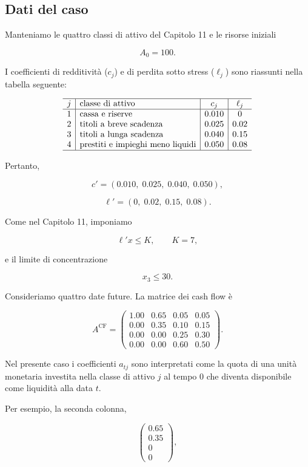 \subsection{Dati del caso}

Manteniamo le quattro classi di attivo del Capitolo 11 e le risorse iniziali

\[
A_0=100.
\]

I coefficienti di redditivit\`a ($c_j$) e di perdita sotto stress ($\ell_j$) sono riassunti
nella tabella seguente:

\[
\begin{array}{c|l|c|c}
\hline
j & \text{classe di attivo} & c_j & \ell_j\\
\hline
1 & \text{cassa e riserve}                 & 0.010 & 0\\
2 & \text{titoli a breve scadenza}         & 0.025 & 0.02\\
3 & \text{titoli a lunga scadenza}         & 0.040 & 0.15\\
4 & \text{prestiti e impieghi meno liquidi}& 0.050 & 0.08\\
\hline
\end{array}
\]

Pertanto,

\[
c'
=
(0.010,\;0.025,\;0.040,\;0.050),
\]

\[
\ell'
=
(0,\;0.02,\;0.15,\;0.08).
\]

Come nel Capitolo 11, imponiamo

\[
\ell'x\leq K,
\qquad
K=7,
\]

\noindent e il limite di concentrazione

\[
x_3\leq30.
\]

Consideriamo quattro date future. La matrice dei cash flow \`e

\[
A^{\mathrm{CF}}
=
\begin{pmatrix}
1.00 & 0.65 & 0.05 & 0.05\\
0.00 & 0.35 & 0.10 & 0.15\\
0.00 & 0.00 & 0.25 & 0.30\\
0.00 & 0.00 & 0.60 & 0.50
\end{pmatrix}.
\]

Nel presente caso i coefficienti $a_{tj}$ sono interpretati come la quota
di una unit\`a monetaria investita nella classe di attivo $j$ al tempo $0$
che diventa disponibile come liquidit\`a alla data $t$.

Per esempio, la seconda colonna,

\[
\begin{pmatrix}
0.65\\
0.35\\
0\\
0
\end{pmatrix},
\]

